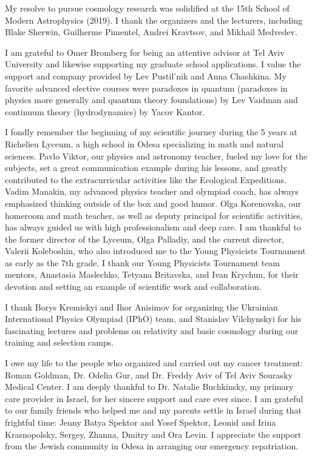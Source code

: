 My resolve to pursue cosmology research was solidified at the 15th School of Modern Astrophysics (2019).
I thank the organizers and the lecturers, including Blake Sherwin, Guilherme Pimentel, Andrei Kravtsov, and Mikhail Medvedev.

I am grateful to Omer Bromberg for being an attentive advisor at Tel Aviv University and likewise supporting my graduate school applications.
I value the support and company provided by Lev Pustil'nik and Anna Chashkina.
My favorite advanced elective courses were paradoxes in quantum (paradoxes in physics more generally and quantum theory foundations) by Lev Vaidman and continuum theory (hydrodynamics) by Yacov Kantor.

I fondly remember the beginning of my scientific journey during the 5 years at Richelieu Lyceum, a high school in Odesa specializing in math and natural sciences.
Pavlo Viktor, our physics and astronomy teacher, fueled my love for the subjects, set a great communication example during his lessons, and greatly contributed to the extracurricular activities like the Ecological Expeditions.
Vadim Manakin, my advanced physics teacher and olympiad coach, has always emphasized thinking outside of the box and good humor.
Olga Korenovska, our homeroom and math teacher, as well as deputy principal for scientific activities, has always guided us with high professionalism and deep care.
I am thankful to the former director of the Lyceum, Olga Palladiy, and the current director, Valerii Koleboshin, who also introduced me to the Young Physicists Tournament as early as the 7th grade.
I thank our Young Physicists Tournament team mentors, Anastasia Maslechko, Tetyana Britavska, and Ivan Krychun, for their devotion and setting an example of scientific work and collaboration.

I thank Borys Kremiskyi and Ihor Anisimov for organizing the Ukrainian International Physics Olympiad (IPhO) team, and Stanislav Vilchynskyi for his fascinating lectures and problems on relativity and basic cosmology during our training and selection camps.

I owe my life to the people who organized and carried out my cancer treatment: Roman Goldman, Dr. Odelia Gur, and Dr. Freddy Aviv of Tel Aviv Sourasky Medical Center.
I am deeply thankful to Dr. Natalie Buchkinsky, my primary care provider in Israel, for her sincere support and care ever since.
I am grateful to our family friends who helped me and my parents settle in Israel during that frightful time:
Jenny Batya Spektor and Yosef Spektor,
Leonid and Irina Krasnopolsky,
Sergey, Zhanna, Dmitry and Ora Levin.
I appreciate the support from the Jewish community in Odesa in arranging our emergency repatriation.

